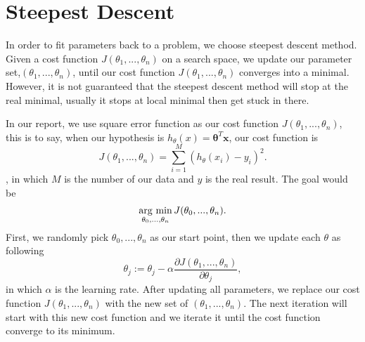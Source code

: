 \documentclass[10pt,a4paper]{report}
\newcommand{\argmin}{\mathop{\rm arg~min}\limits}
\begin{document}
\section{Steepest Descent}

In order to fit parameters back to a problem, we choose steepest descent method. Given a cost function $J(\theta_1,...,\theta_n)$ on a search space, we update our parameter set,$(\theta_1,...,\theta_n)$, until our cost function $J(\theta_1,...,\theta_n)$ converges into a minimal. However, it is not guaranteed that the steepest descent method will stop at the real minimal, usually it stops at local minimal then get stuck in there.

In our report, we use square error function as our cost function $J(\theta_1,...,\theta_n)$, this is to say, when our hypothesis is $h_\theta(x)=\mathbf{\theta}^T \mathbf{x}$, our cost function is \[J(\theta_1,...,\theta_n)= \sum\limits_{i=1}^M (h_\theta(x_i)-y_i)^2          .\] 
, in which $M$ is the number of our data and $y$ is the real result. The goal would be \[\argmin_{\theta_0,...,\theta_n}J(\theta_0,...,\theta_n).\]  
First, we randomly pick $\theta_0,...,\theta_n$ as our start point, then we update each $\theta$ as following \[\theta_j := \theta_j - \alpha{\frac{\partial J(\theta_1,...,\theta_n)}{\partial \theta_j}},\] in which $\alpha$ is the learning rate. After updating all parameters, we replace our cost function $J(\theta_1,...,\theta_n)$ with the new set of $(\theta_1,...,\theta_n)$. The next iteration will start with this new cost function and we iterate it until the cost function converge to its minimum. 








\end{document}
